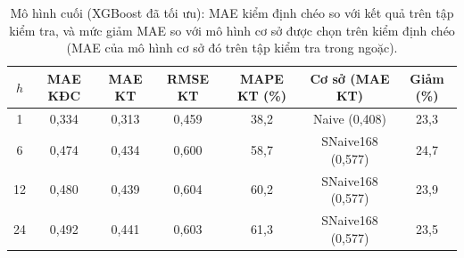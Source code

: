 \begin{table}[htbp]
\centering
\caption[Kiểm định chéo và tập kiểm tra của mô hình cuối]{Mô hình cuối (XGBoost đã tối ưu): MAE kiểm định chéo so với kết quả trên tập kiểm tra, và mức giảm MAE so với mô hình cơ sở được chọn trên kiểm định chéo (MAE của mô hình cơ sở đó trên tập kiểm tra trong ngoặc).}
\label{tab:cv_test}
\footnotesize\setlength{\tabcolsep}{4pt}
\begin{tabular}{|c|c|c|c|c|c|c|}
\hline
\textbf{$h$} & \textbf{MAE KĐC} & \textbf{MAE KT} & \textbf{RMSE KT} & \textbf{MAPE KT (\%)} & \textbf{Cơ sở (MAE KT)} & \textbf{Giảm (\%)} \\
\hline
1 & 0{,}334 & 0{,}313 & 0{,}459 & 38{,}2 & Naive (0{,}408) & 23{,}3 \\ \hline
6 & 0{,}474 & 0{,}434 & 0{,}600 & 58{,}7 & SNaive168 (0{,}577) & 24{,}7 \\ \hline
12 & 0{,}480 & 0{,}439 & 0{,}604 & 60{,}2 & SNaive168 (0{,}577) & 23{,}9 \\ \hline
24 & 0{,}492 & 0{,}441 & 0{,}603 & 61{,}3 & SNaive168 (0{,}577) & 23{,}5 \\ \hline
\end{tabular}
\end{table}
